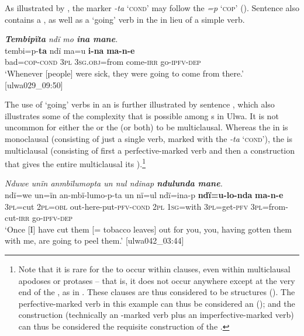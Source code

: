 As illustrated by , the  marker \textit{-ta} ‘\textsc{cond}’ may follow the  \textit{=p} ‘\textsc{cop}’ (). Sentence  also contains a , as well as a  ‘going’ verb in the  in lieu of a simple  verb.

\ea%
    \label{ex:syntax:247}
          \textit{\textbf{Tembipïta} ndï mo \textbf{ina mane}.}\\
\gll tembi=p-\textbf{ta}    ndï  ma=u      \textbf{i-na}    \textbf{ma-n-e}\\
    bad=\textsc{cop{}-cond}  \textsc{3pl}  \textsc{3sg.obj=}from  come-\textsc{irr}  go-\textsc{ipfv-dep}\\
\glt `Whenever [people] were sick, they were going to come from there.’ [ulwa029\_09:50]
\z

The use of  ‘going’ verbs in an  is further illustrated by sentence , which also illustrates some of the complexity that is possible among s in Ulwa. It is not uncommon for either the  or the  (or both) to be multiclausal. Whereas the  in  is  monoclausal (consisting of just a single verb, marked with the   \textit{-ta} ‘\textsc{cond}’), the  is multiclausal (consisting of first a perfective-marked verb and then a  construction that gives the entire multiclausal  its  ).\footnote{Note that it is rare for the   to occur within  clauses, even within multiclausal  apodoses or  protases -- that is, it does not occur anywhere except at the very end of the , as in . These clauses are thus considered to be  structures (). The perfective-marked verb in this example can thus be considered an  (); and the  construction (technically an -marked verb plus an imperfective-marked verb) can thus be considered the requisite  construction of the .}

\ea%
    \label{ex:syntax:248}
          \textit{Nduwe unïn anmbïlumopta un nul ndinap \textbf{ndulunda mane}.}\\
\gll ndï=we  un=ïn  an-mbï-lumo-p-ta        un  nï=ul     ndï=ina-p    \textbf{ndï=u-lo-nda}    \textbf{ma-n-e}\\
    3\textsc{pl}=cut  2\textsc{pl=obl}  out-here-put-\textsc{pfv-cond}  \textsc{2pl}  \textsc{1sg=}with    3\textsc{pl}=get-\textsc{pfv}  3\textsc{pl}=from-cut-\textsc{irr}  go-\textsc{ipfv-dep}\\
\glt `Once [I] have cut them [= tobacco leaves] out for you, you, having gotten them with me, are going to peel them.’ [ulwa042\_03:44]
\z

